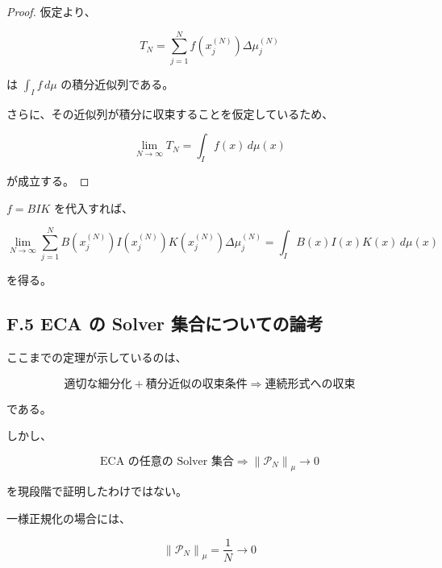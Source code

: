 \documentclass[a4paper,11pt]{article}
\begin{document}
\begin{proof}
仮定より、

\begin{equation}
    T_N
    =
    \sum_{j=1}^{N}
    f(x_j^{(N)})
    \Delta\mu_j^{(N)}
\end{equation}

は $\int_I f\,d\mu$ の積分近似列である。

さらに、その近似列が積分に収束することを仮定しているため、

\begin{equation}
    \lim_{N\to\infty}T_N
    =
    \int_I f(x)\,d\mu(x)
\end{equation}

が成立する。
\end{proof}

$ f=B I K $ を代入すれば、

\begin{equation}
    \boxed{
        \lim_{N\to\infty}
        \sum_{j=1}^{N}
        B(x_j^{(N)})
        I(x_j^{(N)})
        K(x_j^{(N)})
        \Delta\mu_j^{(N)}
        =
        \int_I
        B(x)I(x)K(x)
        \,d\mu(x)
    }
\end{equation}

を得る。


\subsection{F.5 ECA の Solver 集合についての論考}

ここまでの定理が示しているのは、

\begin{equation}
    \text{適切な細分化}
    +
    \text{積分近似の収束条件}
    \Longrightarrow
    \text{連続形式への収束}
\end{equation}

である。

しかし、

\begin{equation}
    \text{ECA の任意の Solver 集合}
    \Longrightarrow
    \left\|\mathcal{P}_N\right\|_\mu\to0
\end{equation}

を現段階で証明したわけではない。

一様正規化の場合には、

\begin{equation}
    \left\|\mathcal{P}_N\right\|_\mu
    =
    \frac1N
    \longrightarrow0
\end{equation}
\end{document}

